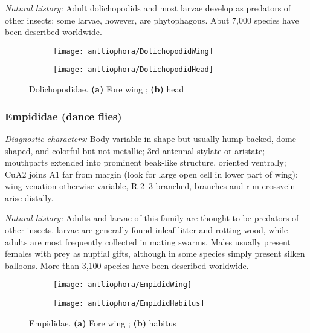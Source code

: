 \noindent{}\textit{Natural history:} Adult dolichopodids and most larvae  develop as predators of other insects; some larvae, however, are phytophagous. Abut 7,000 species have been described worldwide.

\begin{figure}[ht!]
    \centering
    \begin{subfigure}[ht!]{0.5\textwidth}
        \texttt{[image: antliophora/DolichopodidWing]}
        \caption{}
        \label{fig:dolicho1}
    \end{subfigure}
    \qquad
    \begin{subfigure}[ht!]{0.22\textwidth}
        \texttt{[image: antliophora/DolichopodidHead]}
        \caption{}
        \label{fig:dolicho2}
    \end{subfigure}
    \caption{Dolichopodidae. \textbf{(a)} Fore wing \citep[][Fig. 48.30]{mcalpine1981manual}; \textbf{(b)} head \citep[][Fig. 48.4]{mcalpine1981manual}}\label{fig:dolichos}
\end{figure}

\subsubsection{Empididae (dance flies)}
\noindent{}\textit{Diagnostic characters:} Body variable in shape but usually hump-backed, dome-shaped, and colorful but not metallic; 3rd antennal stylate or aristate; mouthparts extended into prominent beak-like structure, oriented ventrally; CuA2 joins A1 far from margin (look for large open cell in lower part of wing); wing venation otherwise variable, R 2--3-branched, branches and r-m crossvein arise distally.\vspace{3mm}

\noindent{}\textit{Natural history:} Adults and larvae of this family are thought to be predators of other insects. larvae are generally found inleaf litter and rotting wood, while adults are most frequently collected in mating swarms. Males usually present females with prey as nuptial gifts, although in some species simply present silken balloons. More than 3,100 species have been described worldwide.

\begin{figure}[ht!]
    \centering
    \begin{subfigure}[ht!]{0.45\textwidth}
        \texttt{[image: antliophora/EmpididWing]}
        \caption{}
        \label{fig:empidid1}
    \end{subfigure}
    \qquad
    \begin{subfigure}[ht!]{0.42\textwidth}
        \texttt{[image: antliophora/EmpididHabitus]}
        \caption{}
        \label{fig:empidid2}
    \end{subfigure}
    \caption{Empididae. \textbf{(a)} Fore wing \citep[][Fig. 47.24]{mcalpine1981manual}; \textbf{(b)} habitus \citep[][Fig. 47.1]{mcalpine1981manual}}\label{fig:empidids}
\end{figure}

